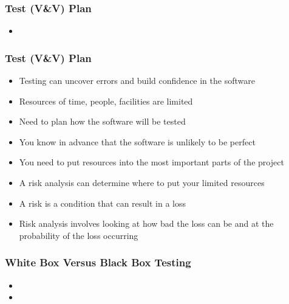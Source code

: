 \documentclass[t,12pt,numbers,fleqn]{beamer}
\begin{document}

\begin{frame}
\frametitle{Test (V\&V) Plan}

\begin{itemize}

\item {}

\end{itemize}

\end{frame}


\begin{frame}
\frametitle{Test (V\&V) Plan}

\begin{itemize}

\item Testing can uncover errors and build confidence in the software
\item Resources of time, people, facilities are limited
\item Need to plan how the software will be tested
\item You know in advance that the software is unlikely to be perfect
\item You need to put resources into the most important parts of the project
\item A risk analysis can determine where to put your limited resources
\item A risk is a condition that can result in a loss
\item Risk analysis involves looking at how bad the loss can be and at the
  probability of the loss occurring

\end{itemize}

\end{frame}


\begin{frame}
\frametitle{White Box Versus Black Box Testing}
\begin{itemize}
\item {}
\item {}
\end{itemize}
\end{frame}
\end{document}
